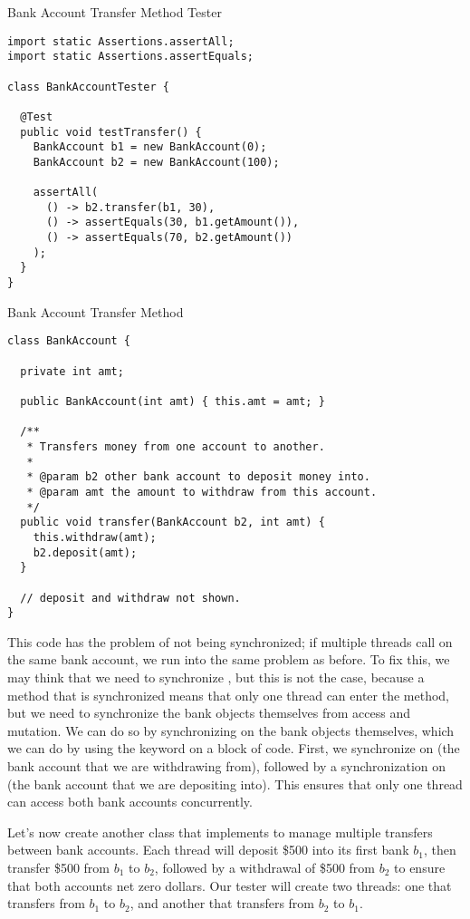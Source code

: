 \begin{cl}{Bank Account Transfer Method Tester}
\begin{lstlisting}[language=MyJava]
import static Assertions.assertAll;
import static Assertions.assertEquals;

class BankAccountTester {

  @Test
  public void testTransfer() {
    BankAccount b1 = new BankAccount(0);
    BankAccount b2 = new BankAccount(100);

    assertAll(
      () -> b2.transfer(b1, 30),
      () -> assertEquals(30, b1.getAmount()),
      () -> assertEquals(70, b2.getAmount())
    );
  }
}
\end{lstlisting}
\end{cl}

\begin{cl}{Bank Account Transfer Method}
\begin{lstlisting}[language=MyJava]
class BankAccount {

  private int amt;

  public BankAccount(int amt) { this.amt = amt; }

  /**
   * Transfers money from one account to another.
   *
   * @param b2 other bank account to deposit money into.
   * @param amt the amount to withdraw from this account.
   */
  public void transfer(BankAccount b2, int amt) {
    this.withdraw(amt);
    b2.deposit(amt);
  }

  // deposit and withdraw not shown.
}
\end{lstlisting}
\end{cl}

This code has the problem of not being synchronized; if multiple threads call  on the same bank account, we run into the same problem as before. To fix this, we may think that we need to synchronize , but this is not the case, because a method that is synchronized means that only one thread can enter the method, but we need to synchronize the bank objects themselves from access and mutation. We can do so by synchronizing on the bank objects themselves, which we can do by using the  keyword on a block of code. First, we synchronize on  (the bank account that we are withdrawing from), followed by a synchronization on  (the bank account that we are depositing into). This ensures that only one thread can access both bank accounts concurrently.

Let's now create another class that implements  to manage multiple transfers between bank accounts. Each thread will deposit \$500 into its first bank $b_1$, then transfer \$500 from $b_1$ to $b_2$, followed by a withdrawal of \$500 from $b_2$ to ensure that both accounts net zero dollars. Our tester will create two threads: one that transfers from $b_1$ to $b_2$, and another that transfers from $b_2$ to $b_1$.

